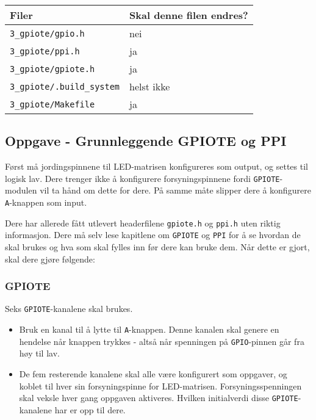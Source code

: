 \begin{center}
 \begin{tabular}{|p{8.5cm} p{5.5cm}|} 
 \hline
 Filer & Skal denne filen endres?  \\ [0.5ex] 
 \hline\hline
 \verb|3_gpiote/gpio.h| & \quad \quad \quad \quad nei  \\ 
 \hline
  \verb|3_gpiote/ppi.h| & \quad \quad \quad \quad ja  \\ 
  \hline
  \verb|3_gpiote/gpiote.h| & \quad \quad \quad \quad ja  \\ 
  \hline
  \verb|3_gpiote/.build_system| &  \quad \quad \quad \quad helst ikke \\ 
 \hline
 \verb|3_gpiote/Makefile| &  \quad \quad \quad \quad ja \\ 
 \hline
\end{tabular}
\end{center}



\subsection{Oppgave - Grunnleggende GPIOTE og PPI}
Først må jordingspinnene til LED-matrisen konfigureres som output, og settes til logisk lav. Dere trenger ikke å konfigurere forsyningspinnene fordi \verb|GPIOTE|-modulen vil ta hånd om dette for dere. På samme måte slipper dere å konfigurere \verb|A|-knappen som input.

Dere har allerede fått utlevert headerfilene \verb|gpiote.h| og \verb|ppi.h| uten riktig informasjon. Dere må selv lese kapitlene om \verb|GPIOTE| og \verb|PPI| for å se hvordan de skal brukes og hva som skal fylles inn før dere kan bruke dem. Når dette er gjort, skal dere gjøre følgende:

\subsubsection{GPIOTE}

Seks \verb|GPIOTE|-kanalene skal brukes. 

\begin{itemize}
    \item Bruk en kanal til å lytte til \verb|A|-knappen. Denne kanalen skal genere en hendelse når knappen trykkes - altså når spenningen på \verb|GPIO|-pinnen går fra høy til lav. 
    \item De fem resterende kanalene skal alle være konfigurert som oppgaver, og koblet til hver sin forsyningspinne for LED-matrisen. Forsyningsspenningen skal veksle hver gang oppgaven aktiveres. Hvilken initialverdi disse \verb|GPIOTE|-kanalene har er opp til dere.
\end{itemize}

